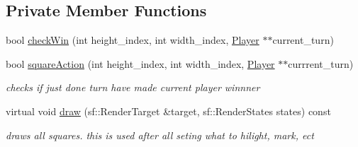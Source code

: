 \subsection*{Private Member Functions}
\begin{DoxyCompactItemize}
\item 
bool \hyperlink{class_board_a4f79d2766626e4167c2b65a43f051545}{check\+Win} (int height\+\_\+index, int width\+\_\+index, \hyperlink{class_player}{Player} $\ast$$\ast$current\+\_\+turn)
\item 
bool \hyperlink{class_board_a204e367441e2b61d02721e70fb0b9a99}{square\+Action} (int height\+\_\+index, int width\+\_\+index, \hyperlink{class_player}{Player} $\ast$$\ast$currrent\+\_\+turn)
\begin{DoxyCompactList}\small\item\em checks if just done turn have made current player winnner \end{DoxyCompactList}\item 
virtual void \hyperlink{class_board_a92d6dbe56e7fc7e96633c80a505a12b3}{draw} (sf\+::\+Render\+Target \&target, sf\+::\+Render\+States states) const 
\begin{DoxyCompactList}\small\item\em draws all squares. this is used after all seting what to hilight, mark, ect \end{DoxyCompactList}\end{DoxyCompactItemize}
